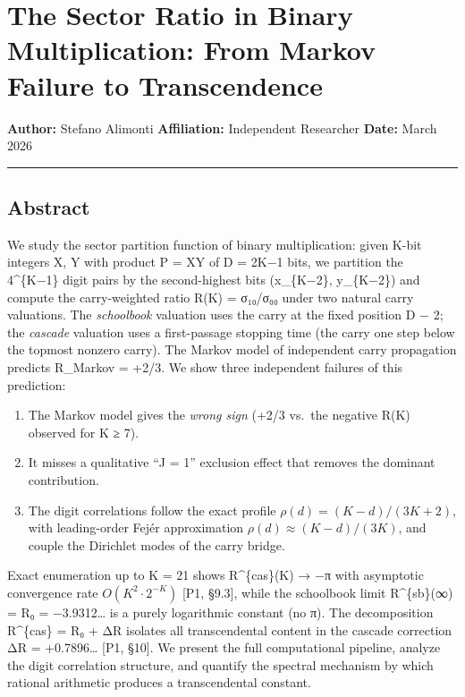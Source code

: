 \documentclass[
  11pt,
]{article}
\author{Stefano Alimonti --- stefalimonti@gmail.com}
\date{March 2026}
\providecommand{\tightlist}{%
  \setlength{\itemsep}{0pt}\setlength{\parskip}{0pt}}
\begin{document}
{
\hypersetup{linkcolor=black}
\setcounter{tocdepth}{2}
\tableofcontents
}
\section{The Sector Ratio in Binary Multiplication: From Markov Failure to
Transcendence}\label{the-sector-ratio-in-binary-multiplication-from-markov-failure-to-transcendence}

\textbf{Author:} Stefano Alimonti \textbf{Affiliation:} Independent Researcher
\textbf{Date:} March 2026

\begin{center}\rule{0.5\linewidth}{0.5pt}\end{center}

\newpage

\subsection{Abstract}\label{abstract}

We study the sector partition function of binary multiplication: given K-bit
integers X, Y with product P = XY of D = 2K−1 bits, we partition the
4\^{}\{K−1\} digit pairs by the second-highest bits (x\_\{K−2\}, y\_\{K−2\}) and
compute the carry-weighted ratio R(K) = σ₁₀/σ₀₀ under two natural carry
valuations. The \emph{schoolbook} valuation uses the carry at the fixed position
D − 2; the \emph{cascade} valuation uses a first-passage stopping time (the
carry one step below the topmost nonzero carry). The Markov model of independent
carry propagation predicts R\_Markov = +2/3. We show three independent failures
of this prediction:

\begin{enumerate}
\def\labelenumi{\arabic{enumi}.}
\tightlist
\item
  The Markov model gives the \emph{wrong sign} (+2/3 vs.~the negative R(K)
  observed for K ≥ 7).
\item
  It misses a qualitative ``J = 1'' exclusion effect that removes the dominant
  contribution.
\item
  The digit correlations follow the exact profile \(\rho(d) = (K-d)/(3K+2)\),
  with leading-order Fejér approximation \(\rho(d) \approx (K-d)/(3K)\), and
  couple the Dirichlet modes of the carry bridge.
\end{enumerate}

Exact enumeration up to K = 21 shows R\^{}\{cas\}(K) → −π with asymptotic
convergence rate \(O(K^2 \cdot 2^{-K})\) {[}P1, §9.3{]}, while the schoolbook
limit R\^{}\{sb\}(∞) = R₀ = −3.9312\ldots{} is a purely logarithmic constant (no
π). The decomposition R\^{}\{cas\} = R₀ + ΔR isolates all transcendental content
in the cascade correction ΔR = +0.7896\ldots{} {[}P1, §10{]}. We present the
full computational pipeline, analyze the digit correlation structure, and
quantify the spectral mechanism by which rational arithmetic produces a
transcendental constant.
\end{document}
